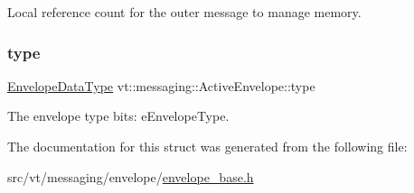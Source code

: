 Local reference count for the outer message to manage memory. 

\mbox{\label{structvt_1_1messaging_1_1_active_envelope_aaa2cebe2e468e71249feff85841521d4}} 
\subsubsection{\texorpdfstring{type}{type}}
{\footnotesize\ttfamily \hyperlink{namespacevt_a2740126d59f361d9ba46f66b3b4b0d3d}{Envelope\+Data\+Type} vt\+::messaging\+::\+Active\+Envelope\+::type}



The envelope type bits\+: {\ttfamily e\+Envelope\+Type}. 



The documentation for this struct was generated from the following file\+:\begin{DoxyCompactItemize}
\item 
src/vt/messaging/envelope/\hyperlink{envelope__base_8h}{envelope\+\_\+base.\+h}\end{DoxyCompactItemize}
